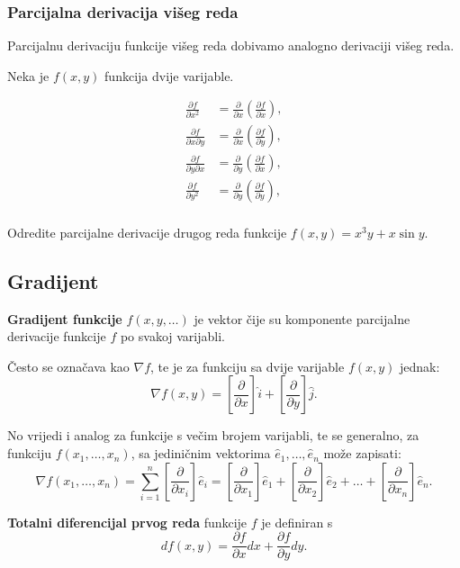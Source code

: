 \subsubsection{Parcijalna derivacija višeg reda}

Parcijalnu derivaciju funkcije višeg reda dobivamo analogno derivaciji višeg
reda.

Neka je $f(x,y)$ funkcija dvije varijable.

\begin{align*}
  \frac{\partial f}{\partial x^2} &= \frac{\partial}{\partial x} (\frac{\partial f}{\partial x}),\\
  \frac{\partial f}{\partial x \partial y} &= \frac{\partial}{\partial x} (\frac{\partial f}{\partial y}),\\
  \frac{\partial f}{\partial y \partial x} &= \frac{\partial}{\partial y} (\frac{\partial f}{\partial x}),\\
  \frac{\partial f}{\partial y^2} &= \frac{\partial}{\partial y} (\frac{\partial f}{\partial y}),\\
\end{align*}

\begin{example}
  Odredite parcijalne derivacije drugog reda funkcije $f(x,y)=x^3y+x\sin y$.
\end{example}

\subsection{Gradijent}

\textbf{Gradijent funkcije} $f(x,y,\dots)$ je vektor čije su komponente
parcijalne derivacije funkcije $f$ po svakoj varijabli.

Često se označava kao $\nabla f$, te je za funkciju sa dvije varijable $f(x,y)$ jednak:
$$
  \nabla f(x,y) = \left[\frac{\partial}{\partial x}\right]\hat{i} + \left[\frac{\partial}{\partial y}\right]\hat{j}.
$$

No vrijedi i analog za funkcije s večim brojem varijabli, te se generalno, za
funkciju $f(x_1, \dots, x_n)$, sa jediničnim vektorima
$\hat{e}_1,\dots,\hat{e}_n$ može zapisati:
$$
  \nabla f(x_1, \dots, x_n) = \sum_{i=1}^n \left[\frac{\partial}{\partial x_i}\right]\hat{e}_i = \left[\frac{\partial}{\partial x_1}\right]\hat{e}_1 + \left[\frac{\partial}{\partial x_2}\right]\hat{e}_2 + \dots + \left[\frac{\partial}{\partial x_n}\right]\hat{e}_n.
$$

\textbf{Totalni diferencijal prvog reda} funkcije $f$ je definiran s
$$
df(x,y) = \frac{\partial f}{\partial x}dx + \frac{\partial f}{\partial y}dy.
$$

